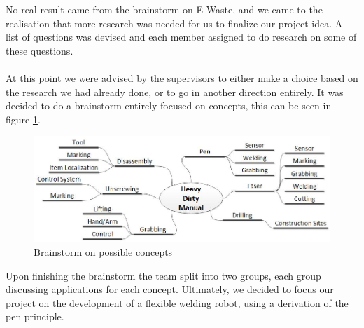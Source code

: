 \documentclass[11pt,a4paper]{article}
\begin{document}
No real result came from the brainstorm on E-Waste, and we came to the realisation that more research was needed for us to finalize our project idea. A list of questions was devised and each member assigned to do research on some of these questions. \\~~\\
At this point we were advised by the supervisors to either make a choice based on the research we had already done, or to go in another direction entirely. It was decided to do a brainstorm entirely focused on concepts, this can be seen in figure \ref{fig:conceptsBrainstorm}.
\begin{figure}[!h]
	\centering
	\includegraphics[scale=.5]{./graphics/conceptsBrainstorm.jpg}
	\caption{Brainstorm on possible concepts}
	\label{fig:conceptsBrainstorm}
\end{figure}
Upon finishing the brainstorm the team split into two groups, each group discussing applications for each concept. Ultimately, we decided to focus our project on the development of a flexible welding robot, using a derivation of the pen principle.
\end{document}
